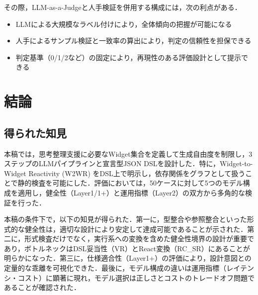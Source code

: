 \documentclass[a4paper,10pt]{jarticle}
\begin{document}
その際，LLM-as-a-Judgeと人手検証を併用する構成には，次の利点がある．
\begin{itemize}
\item LLMによる大規模なラベル付けにより，全体傾向の把握が可能になる
\item 人手によるサンプル検証と一致率の算出により，判定の信頼性を担保できる
\item 判定基準（0/1/2など）の固定により，再現性のある評価設計として提示できる
\end{itemize}



\section{結論}
\label{sec:conclusion}

\subsection{得られた知見}
\label{subsec:conc_future}


本稿では，思考整理支援に必要なWidget集合を定義して生成自由度を制限し，3ステップのLLMパイプラインと宣言型JSON DSLを設計した．特に，Widget-to-Widget Reactivity (W2WR) をDSL上で明示し，依存関係をグラフとして扱うことで静的検査を可能にした．評価においては，50ケースに対して5つのモデル構成を適用し，健全性（Layer1/1+）と運用指標（Layer2）の双方から多角的な検証を行った．


本稿の条件下で，以下の知見が得られた．第一に，型整合や参照整合といった形式的な健全性は，適切な設計により安定して達成可能であることが示された．第二に，形式検査だけでなく，実行系への変換を含めた健全性境界の設計が重要であり，ボトルネックはDSL妥当性（VR）とReact変換（RC\_SR）にあることが明らかになった．第三に，仕様適合性（Layer1+）の評価により，設計意図との定量的な乖離を可視化できた．最後に，モデル構成の違いは運用指標（レイテンシ・コスト）に顕著に現れ，モデル選択は正しさとコストのトレードオフ問題であることが確認された．
\end{document}
